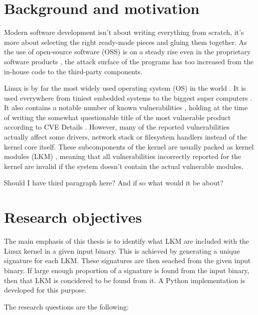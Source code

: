 
\section{Background and motivation}

Modern software development isn't about writing everything from scratch, it's more about selecting
the right ready-made pieces and gluing them together. As the use of open-source software (OSS) is
on a steady rise even in the proprietary software products \cite{deshpande2008total}, the attack
surface of the programs has too increased from the in-house code to the third-party components.

Linux is by far the most widely used operating system (OS) in the world \cite{blah}. It is used
everywhere from tiniest embedded systems \cite{picotux} to the biggest super computers
\cite{top500linuxshare}. It also contains a notable number of known vulnerabilities
\cite{cvedetailslinuxkernel}, holding at the time of writing the somewhat questionable title of the
most vulnerable product according to CVE Details \cite{cvedetailstop50}. However, many of the
reported vulnerabilities actually affect some drivers, network stack or filesystem handlers instead
of the kernel core itself. These subcomponents of the kernel are usually packed as kernel modules
(LKM) \cite{blah}, meaning that all vulnerabilities incorrectly reported for the kernel are invalid
if the system doesn't contain the actual vulnerable modules.

Should I have third paragraph here? And if so what would it be about?

\section{Research objectives}

The main emphasis of this thesis is to identify what LKM are included with the Linux kernel in a
given input binary. This is achieved by generating a unique signature for each LKM. These
signatures are then seached from the given input binary. If large enough proportion of a signature
is found from the input binary, then that LKM is concidered to be found from it. A Python
implementation is developed for this purpose.

\label{sect:questions}

The research questions are the following:


